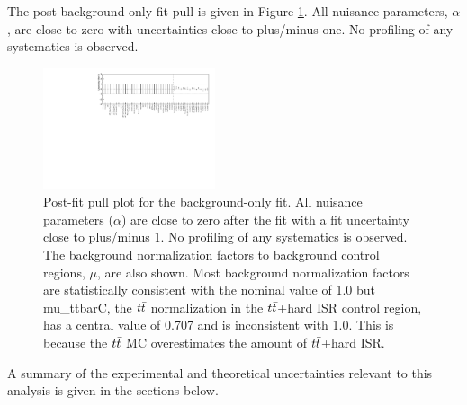 

%


\indent The post background only fit pull is given in Figure \ref{figure.pullPlot}.  All nuisance parameters, $\alpha$, are close to zero with uncertainties close to plus/minus one.  No profiling of any systematics is observed. \\

\begin{figure}[h!]
	\begin{center}
		\includegraphics[width=0.45\textwidth, angle=180]{HistFitterStuff/pullPlot.pdf}
		\caption[Post-fit pull plot for the background-only fit]{Post-fit pull plot for the background-only fit.  All nuisance parameters ($\alpha$) are close to zero after the fit with a fit uncertainty close to plus/minus 1.  No profiling of any systematics is observed.  The background normalization factors to background control regions, $\mu$, are also shown.  Most background normalization factors are statistically consistent with the nominal value of 1.0 but mu\_ttbarC, the $t\bar{t}$ normalization in the $t\bar{t}$+hard ISR control region, has a central value of 0.707 and is inconsistent with 1.0.  This is because the $t\bar{t}$ MC overestimates the amount of $t\bar{t}$+hard ISR.   }
		\label{figure.pullPlot}
	\end{center}
\end{figure}

\indent A summary of the experimental and theoretical uncertainties relevant to this analysis is given in the sections below. \\



